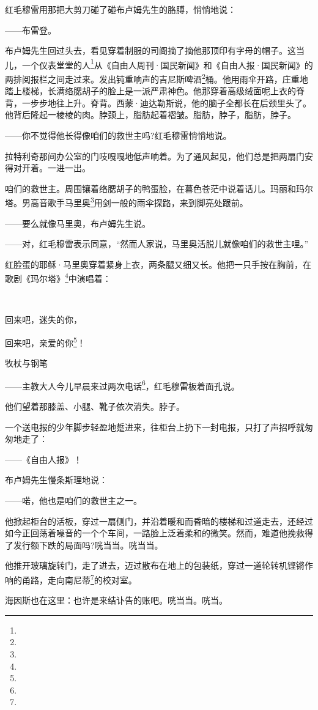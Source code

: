 \par 红毛穆雷用那把大剪刀碰了碰布卢姆先生的胳膊，悄悄地说：
\par ——布雷登。
\par 布卢姆先生回过头去，看见穿着制服的司阍摘了摘他那顶印有字母的帽子。这当儿，一个仪表堂堂的人\footnote{}从《自由人周刊·国民新闻》和《自由人报·国民新闻》的两排阅报栏之间走过来。发出钝重响声的吉尼斯啤酒\footnote{}桶。他用雨伞开路，庄重地踏上楼梯，长满络腮胡子的脸上是一派严肃神色。他那穿着高级绒面呢上衣的脊背，一步步地往上升。脊背。西蒙·迪达勒斯说，他的脑子全都长在后颈里头了。他背后隆起一棱棱的肉。脖颈上，脂肪起着褶皱。脂肪，脖子，脂肪，脖子。
\par ——你不觉得他长得像咱们的救世主吗?红毛穆雷悄悄地说。
\par 拉特利奇那间办公室的门吱嘎嘎地低声响着。为了通风起见，他们总是把两扇门安得对开着。一进一出。
\par 咱们的救世主。周围镶着络腮胡子的鸭蛋脸，在暮色苍茫中说着话儿。玛丽和玛尔塔。男高音歌手马里奥\footnote{}用剑一般的雨伞探路，来到脚亮处跟前。
\par ——要么就像马里奥，布卢姆先生说。
\par ——对，红毛穆雷表示同意，“然而人家说，马里奥活脱儿就像咱们的救世主哩。”
\par 红脸蛋的耶稣·马里奥穿着紧身上衣，两条腿又细又长。他把一只手按在胸前，在歌剧《玛尔塔》\footnote{}中演唱着：
\par  
\par 回来吧，迷失的你，
\par 回来吧，亲爱的你\footnote{}！
\par 牧杖与钢笔
\par ——主教大人今儿早晨来过两次电话\footnote{}，红毛穆雷板着面孔说。
\par 他们望着那膝盖、小腿、靴子依次消失。脖子。
\par 一个送电报的少年脚步轻盈地踅进来，往柜台上扔下一封电报，只打了声招呼就匆匆地走了：
\par ——《自由人报》！
\par 布卢姆先生慢条斯理地说：
\par ——喏，他也是咱们的救世主之一。
\par 他掀起柜台的活板，穿过一扇侧门，并沿着暖和而昏暗的楼梯和过道走去，还经过如今正回荡着噪音的一个个车间，一路脸上泛着柔和的微笑。然而，难道他挽救得了发行额下跌的局面吗?咣当当。咣当当。
\par 他推开玻璃旋转门，走了进去，迈过散布在地上的包装纸，穿过一道轮转机铿锵作响的甬路，走向南尼蒂\footnote{}的校对室。
\par 海因斯也在这里：也许是来结讣告的账吧。咣当当。咣当。

